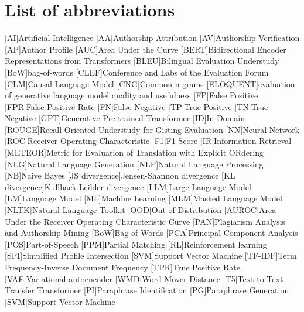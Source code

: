 \chapter*{List of abbreviations}

\begin{acronym}[XXXXXXXXX]
    [AI]{Artificial Intelligence}
    [AA]{Authorship Attribution}
    [AV]{Authorship Verification}
    [AP]{Author Profile}
    [AUC]{Area Under the Curve}
    [BERT]{Bidirectional Encoder Representations from Transformers}
    [BLEU]{Bilingual Evaluation Understudy}
    [BoW]{bag-of-words}
    [CLEF]{Conference and Labs of the Evaluation Forum}
    [CLM]{Causal Language Model}
    [CNG]{Common n-grams}
    [ELOQUENT]{evaluation of generative language model quality and usefulness}
    [FP]{False Positive}
    [FPR]{False Positive Rate}
    [FN]{False Negative}
    [TP]{True Positive}
    [TN]{True Negative}
    [GPT]{Generative Pre-trained Transformer}
    [ID]{In-Domain}
    [ROUGE]{Recall-Oriented Understudy for Gisting Evaluation}
    [NN]{Neural Network}
    [ROC]{Receiver Operating Characteristic}
    [F1]{F1-Score}
    [IR]{Information Retrieval}
    [METEOR]{Metric for Evaluation of Translation with Explicit ORdering}
    [NLG]{Natural Language Generation}
    [NLP]{Natural Language Processing}
    [NB]{Naive Bayes}
    [JS divergence]{Jensen-Shannon divergence}
    [KL divergence]{Kullback-Leibler divergence}
    [LLM]{Large Language Model}
    [LM]{Language Model}
    [ML]{Machine Learning}
    [MLM]{Masked Language Model}
    [NLTK]{Natural Language Toolkit}
    [OOD]{Out-of-Distribution}
    [AUROC]{Area Under the Receiver Operating Characteristic Curve}
    [PAN]{Plagiarism Analysis and Authorship Mining} %
    [BoW]{Bag-of-Words}
    [PCA]{Principal Component Analysis}
    [POS]{Part-of-Speech}
    [PPM]{Partial Matching}
    [RL]{Reinforcement learning}
    [SPI]{Simplified Profile Intersection}
    [SVM]{Support Vector Machine}
    [TF-IDF]{Term Frequency-Inverse Document Frequency}
    [TPR]{True Positive Rate}
    [VAE]{Variational autoencoder}
    [WMD]{Word Mover Distance}
    [T5]{Text-to-Text Transfer Transformer}
    [PI]{Paraphrase Identification}
    [PG]{Paraphrase Generation}
    [SVM]{Support Vector Machine}

\end{acronym}

